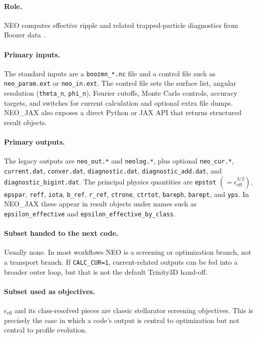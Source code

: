 \documentclass[11pt]{article}
\newcommand{\code}[1]{\texttt{#1}}
\begin{document}
\paragraph{Role.}
NEO computes effective ripple and related trapped-particle diagnostics from
Boozer data \citep{Nemov1999,Nemov2008,NEORepo,NEOJaxRepo}.

\paragraph{Primary inputs.}
The standard inputs are a \code{boozmn\_*.nc} file and a control file such as
\code{neo\_param.ext} or \code{neo\_in.ext}. The control file sets the surface
list, angular resolution (\code{theta\_n}, \code{phi\_n}), Fourier cutoffs,
Monte Carlo controls, accuracy targets, and switches for current calculation
and optional extra file dumps. NEO\_JAX also exposes a direct Python or JAX API
that returns structured result objects.

\paragraph{Primary outputs.}
The legacy outputs are \code{neo\_out.*} and \code{neolog.*}, plus optional
\code{neo\_cur.*}, \code{current.dat}, \code{conver.dat},
\code{diagnostic.dat}, \code{diagnostic\_add.dat}, and
\code{diagnostic\_bigint.dat}. The principal physics quantities are
\code{epstot} \((=\epsilon_{\mathrm{eff}}^{3/2})\), \code{epspar},
\code{reff}, \code{iota}, \code{b\_ref}, \code{r\_ref}, \code{ctrone},
\code{ctrtot}, \code{bareph}, \code{barept}, and \code{yps}. In NEO\_JAX
these appear in result objects under names such as
\code{epsilon\_effective} and \code{epsilon\_effective\_by\_class}.

\paragraph{Subset handed to the next code.}
Usually none. In most workflows NEO is a screening or optimization branch, not
a transport branch. If \code{CALC\_CUR=1}, current-related outputs can be fed
into a broader outer loop, but that is not the default Trinity3D hand-off.

\paragraph{Subset used as objectives.}
\(\epsilon_{\mathrm{eff}}\) and its class-resolved pieces are classic
stellarator screening objectives. This is precisely the case in which a code's
output is central to optimization but not central to profile evolution.
\end{document}
